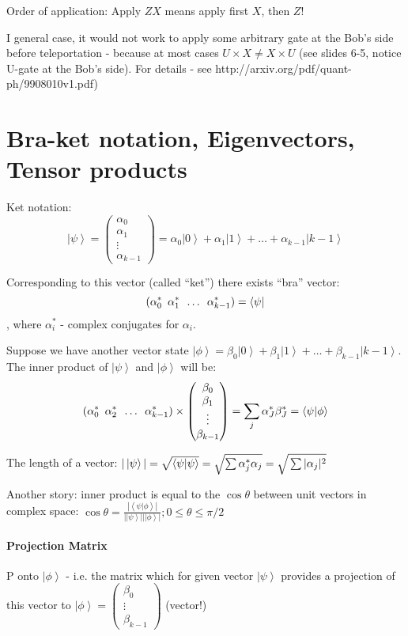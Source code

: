 \documentclass{scrartcl}
\newcommand{\ket}[1]{\left| #1 \right>} %
\newcommand{\bra}[1]{\left< #1 \right|} %
\newcommand{\braket}[2]{\left< #1 | #2 \right>} %
\begin{document}
Order of application: Apply $ZX$ means apply first $X$, then $Z$!

I general case, it would not work to apply some arbitrary gate at the Bob's side
before teleportation - because at most cases $U \times X \neq X \times U$ (see
slides 6-5, notice U-gate at the Bob's side). For details - see
http://arxiv.org/pdf/quant-ph/9908010v1.pdf)

\section{Bra-ket notation, Eigenvectors, Tensor products}
\label{chap:7}

Ket notation:$$\ket\psi = \begin{pmatrix} \alpha_0 \\\alpha_1 \\ \vdots \\
  \alpha_{k-1} \end{pmatrix} = \alpha_0\ket0 + \alpha_1\ket1 + \dots +
\alpha_{k-1}\ket{k-1}$$

Corresponding to this vector (called ``ket'') there exists ``bra'' vector:
$$(\alpha_0^* \enskip \alpha_1^* \enskip \dots \enskip \alpha_{k-1}^*) =
\bra\psi $$, where $\alpha_i^*$ - complex conjugates for $\alpha_i$.

Suppose we have another vector state $\ket\phi = \beta_0\ket0 + \beta_1\ket1 +
\dots + \beta_{k-1}\ket{k-1}$. The inner product of $\ket\psi$ and $\ket\phi$
will be: $$(\alpha_0^* \enskip \alpha_2^* \enskip \dots \enskip \alpha_{k-1}^*)
\times \begin{pmatrix} \beta_0 \\ \beta_1 \\ \vdots \\ \beta_{k-1} \end{pmatrix}
= \sum_j\alpha_J^* \beta_J^* = \braket\psi\phi $$

The length of a vector: $|\ket\psi| = \sqrt{ \braket\psi\psi} = \sqrt{\sum
  \alpha_j^* \alpha_j} = \sqrt{\vphantom{\sum\alpha_j^*} \sum|\alpha_j|^2}$

Another story: inner product is equal to the $\cos\theta$ between unit vectors
in complex space: $\cos \theta = \frac{|\braket\psi\phi|}{|\ket\psi||\ket\phi|};
0\leq \theta \leq \pi/2$

\paragraph{Projection Matrix} P onto $\ket\phi$ - i.e. the matrix which for
given vector $\ket\psi$ provides a projection of this vector to
$\ket\phi= \begin{pmatrix}\beta_0 \\ \vdots \\ \beta_{k-1} \end{pmatrix}$
(vector!)
\end{document}
